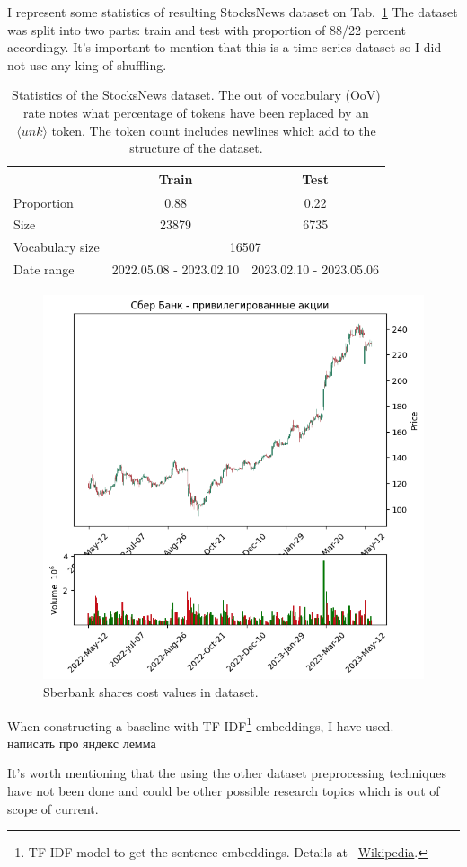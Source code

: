 \documentclass{article}
\begin{document}
I represent some statistics of resulting StocksNews dataset on Tab.~\ref{tab:statistics} The dataset was split into two parts: train and test with proportion of 88/22 percent accordingy. It's important to mention that this is a time series dataset so I did not use any king of shuffling. 

\begin{table}[tbh!]
\begin{center}
\begin{tabular}[t]{|l|cc|}
\hline
 & Train & Test \\
\hline
Proportion & 0.88 & 0.22  \\
Size & 23879 & 6735 \\
Vocabulary size & \multicolumn{2}{c|}{16507} \\
Date range & 2022.05.08 - 2023.02.10 & 2023.02.10 - 2023.05.06 \\

\hline
\end{tabular}
\caption{Statistics of the StocksNews dataset. The out of vocabulary (OoV) rate notes what percentage of tokens have been replaced by an $\langle unk \rangle$ token. The token count includes newlines which add to the structure of the dataset.}
\label{tab:statistics}
\end{center}
\end{table}

\begin{figure}[!tbh]
    \centering
    \includegraphics[width=0.3\linewidth]{sber.png}
    \caption{Sberbank shares cost values in dataset.}
    \label{fig:sber}
\end{figure}

When constructing a baseline with TF-IDF\footnote{TF-IDF model to get the sentence embeddings. Details at ~\href{https://ru.wikipedia.org/wiki/TF-IDF}{Wikipedia}.} embeddings, I have used. -------- написать про яндекс лемма

It's worth mentioning that the using the other dataset preprocessing techniques have not been done and could be other possible research topics which is out of scope of current.
\end{document}

